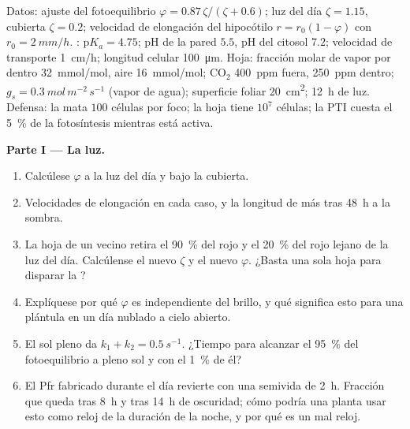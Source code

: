 \begin{problem}
\label{pb:b3:plant-molecular-physiology:1}
Datos: ajuste del fotoequilibrio $\varphi = 0.87\,\zeta/(\zeta + 0.6)$;
luz del día $\zeta = 1.15$, cubierta $\zeta = 0.2$; velocidad de
elongación del hipocótilo $r = r_{0}(1 - \varphi)$ con
$r_{0} = \qty{2}{mm/h}$. : $\mathrm{p}K_{a} = 4.75$; pH de la
pared $5.5$, pH del citosol $7.2$; velocidad de transporte
\qty{1}{cm/h}; longitud celular \qty{100}{\micro m}. Hoja: fracción
molar de vapor por dentro \qty{32}{mmol/mol}, aire \qty{16}{mmol/mol};
CO$_{2}$ \qty{400}{ppm} fuera, \qty{250}{ppm} dentro; $g_{s} =
\qty{0.3}{mol\,m^{-2}\,s^{-1}}$ (vapor de agua); superficie foliar
\qty{20}{cm^2}; \qty{12}{h} de luz. Defensa: la 
mata $100$ células por foco; la hoja tiene $10^{7}$ células; la PTI
cuesta el \qty{5}{\%} de la fotosíntesis mientras está activa.

\medskip
\noindent\textbf{Parte I --- La luz.}
\begin{enumerate}
  \item Calcúlese $\varphi$ a la luz del día y bajo la cubierta.
  \item Velocidades de elongación en cada caso, y la longitud de más
        tras \qty{48}{h} a la sombra.
  \item La hoja de un vecino retira el \qty{90}{\%} del rojo y el
        \qty{20}{\%} del rojo lejano de la luz del día. Calcúlense el
        nuevo $\zeta$ y el nuevo $\varphi$. ¿Basta una sola hoja para
        disparar la ?
  \item Explíquese por qué $\varphi$ es independiente del brillo, y qué
        significa esto para una plántula en un día nublado a cielo
        abierto.
  \item El sol pleno da $k_{1} + k_{2} = \qty{0.5}{s^{-1}}$. ¿Tiempo
        para alcanzar el \qty{95}{\%} del fotoequilibrio a pleno sol y
        con el \qty{1}{\%} de él?
  \item El Pfr fabricado durante el día revierte con una semivida de
        \qty{2}{h}. Fracción que queda tras \qty{8}{h} y tras
        \qty{14}{h} de oscuridad; cómo podría una planta usar esto como
        reloj de la duración de la noche, y por qué es un mal reloj.
\end{enumerate}


\end{problem}
